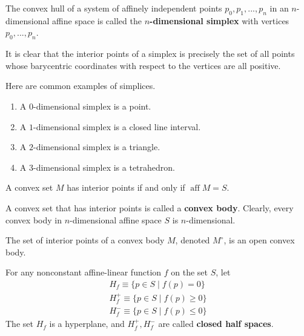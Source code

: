 \documentclass{article}
\DeclareMathOperator{\aff}{aff}
\begin{document}
    \begin{definition}
      The convex hull of a system of affinely independent points $p_0, p_1, ..., p_n$ in an $n$-dimensional affine space is called the \textbf{$n$-dimensional simplex} with vertices $p_0, ..., p_n$. 
    \end{definition}

    It is clear that the interior points of a simplex is precisely the set of all points whose barycentric coordinates with respect to the vertices are all positive. 

    \begin{example}
      Here are common examples of simplices.
      \begin{enumerate}
        \item A $0$-dimensional simplex is a point. 
        \item A $1$-dimensional simplex is a closed line interval. 
        \item A $2$-dimensional simplex is a triangle. 
        \item A $3$-dimensional simplex is a tetrahedron. 
      \end{enumerate}
    \end{example}

    \begin{proposition}
      A convex set $M$ has interior points if and only if $\aff M = S$. 
    \end{proposition}

    \begin{definition}
      A convex set that has interior points is called a \textbf{convex body}. Clearly, every convex body in $n$-dimensional affine space $S$ is $n$-dimensional. 
    \end{definition}

    The set of interior points of a convex body $M$, denoted $M^\circ$, is an open convex body. 

    \begin{definition}
      For any nonconstant affine-linear function $f$ on the set $S$, let
      \begin{align*}
        H_f \equiv \{p \in S \;|\; f(p) = 0\} \\
        H^+_f \equiv \{p \in S \;|\; f(p) \geq 0\} \\
        H^-_f \equiv \{p \in S \;|\; f(p) \leq 0\}
      \end{align*}
      The set $H_f$ is a hyperplane, and $H^+_f, H^-_f$ are called \textbf{closed half spaces}. 
    \end{definition}
\end{document}
